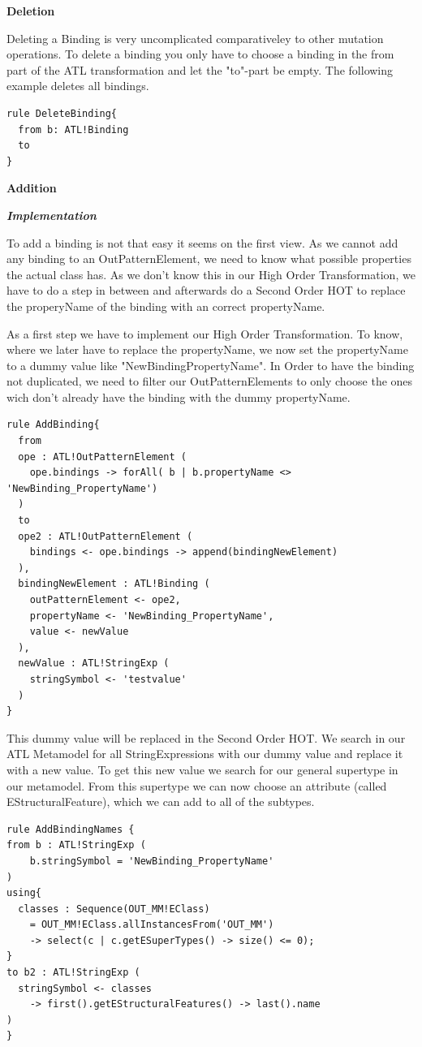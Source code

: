 \documentclass{llncs}
\begin{document}
\textbf{Deletion}

Deleting a Binding is very uncomplicated comparativeley to other mutation operations.
To delete a binding you only have to choose a binding in the from part of the ATL transformation and let the "to"-part be empty.
The following example deletes  all bindings.

\begin{lstlisting}
rule DeleteBinding{
  from b: ATL!Binding
  to
}
\end{lstlisting}

\textbf{Addition}

\textbf\textit{{Implementation}}

To add a binding is not that easy it seems on the first view.
As we cannot add any binding to an OutPatternElement, we need to know what possible properties the actual class has.
As we don't know this in our High Order Transformation, we have to do a step in between and afterwards do a Second Order HOT to replace the properyName of the binding with an correct propertyName.

As a first step we have to implement our High Order Transformation. To know, where we later have to replace the propertyName, we now set the propertyName to a dummy value like "NewBindingPropertyName".
In Order to have the binding not duplicated, we need to filter our OutPatternElements to only choose the ones wich don't already have the binding with the dummy propertyName.

\begin{lstlisting}
rule AddBinding{
  from 
  ope : ATL!OutPatternElement ( 
    ope.bindings -> forAll( b | b.propertyName <> 'NewBinding_PropertyName')
  )
  to
  ope2 : ATL!OutPatternElement (
    bindings <- ope.bindings -> append(bindingNewElement)
  ), 
  bindingNewElement : ATL!Binding (
    outPatternElement <- ope2,
    propertyName <- 'NewBinding_PropertyName',
    value <- newValue	
  ),
  newValue : ATL!StringExp (
    stringSymbol <- 'testvalue'
  )	
}
\end{lstlisting}

This dummy value will be replaced in the Second Order HOT.
We search in our ATL Metamodel for all StringExpressions with our dummy value and replace it with a new value.
To get this new value we search for our general supertype in our metamodel. From this supertype we can now choose an attribute (called EStructuralFeature), which we can add to all of the subtypes.

\begin{lstlisting}
rule AddBindingNames {
from b : ATL!StringExp (
    b.stringSymbol = 'NewBinding_PropertyName'
)
using{
  classes : Sequence(OUT_MM!EClass) 
	= OUT_MM!EClass.allInstancesFrom('OUT_MM') 
	-> select(c | c.getESuperTypes() -> size() <= 0);
}
to b2 : ATL!StringExp ( 
  stringSymbol <- classes 
	-> first().getEStructuralFeatures() -> last().name
)	
}
\end{lstlisting}
\end{document}
